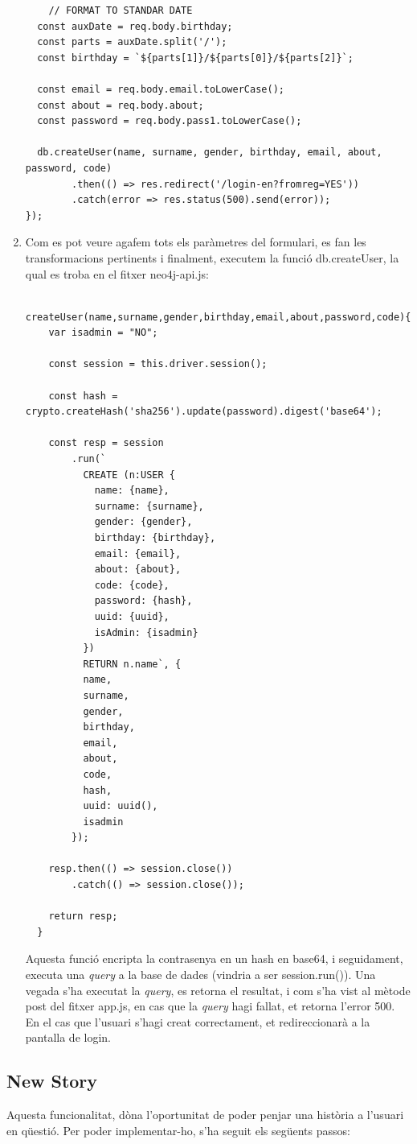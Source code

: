 \documentclass[11pt,catalan,listoffigures,listoftables]{tfgetsinf}
\begin{document}
\begin{enumerate}
\begin{lstlisting}
    // FORMAT TO STANDAR DATE
  const auxDate = req.body.birthday;
  const parts = auxDate.split('/');
  const birthday = `${parts[1]}/${parts[0]}/${parts[2]}`;

  const email = req.body.email.toLowerCase();
  const about = req.body.about;
  const password = req.body.pass1.toLowerCase();

  db.createUser(name, surname, gender, birthday, email, about, password, code)
        .then(() => res.redirect('/login-en?fromreg=YES'))
        .catch(error => res.status(500).send(error));
});
\end{lstlisting}
\item Com es pot veure agafem tots els paràmetres del formulari, es fan les transformacions pertinents i finalment, executem la funció db.createUser, la qual es troba en el fitxer neo4j-api.js:
\begin{lstlisting}
  createUser(name,surname,gender,birthday,email,about,password,code){
    var isadmin = "NO";

    const session = this.driver.session();

    const hash = crypto.createHash('sha256').update(password).digest('base64');

    const resp = session
        .run(`
          CREATE (n:USER {
            name: {name},
            surname: {surname},
            gender: {gender},
            birthday: {birthday},
            email: {email},
            about: {about},
            code: {code},
            password: {hash},
            uuid: {uuid},
            isAdmin: {isadmin}
          })
          RETURN n.name`, {
          name,
          surname,
          gender,
          birthday,
          email,
          about,
          code,
          hash,
          uuid: uuid(),
          isadmin
        });

    resp.then(() => session.close())
        .catch(() => session.close());

    return resp;
  }
\end{lstlisting}
Aquesta funció encripta la contrasenya en un hash en base64, i seguidament, executa una \textit{query} a la base de dades (vindria a ser session.run()). Una vegada s'ha executat la \textit{query}, es retorna el resultat, i com s'ha vist al mètode post del fitxer app.js, en cas que la \textit{query} hagi fallat, et retorna l'error 500. En el cas que l'usuari s'hagi creat correctament, et redireccionarà a la pantalla de login.
\end{enumerate}
\newpage
\subsection{New Story}
Aquesta funcionalitat, dòna l'oportunitat de poder penjar una història a l'usuari en qüestió. Per poder implementar-ho, s'ha seguit els següents passos:
\end{document}
